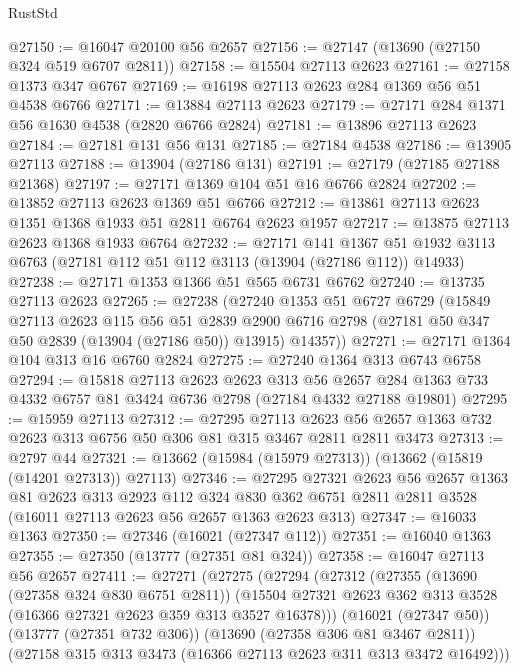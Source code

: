 \begin{lexlean}{RustStd}
\begin{coremodule}
@27150 := @16047 @20100 @56 @2657
@27156 := @27147 (@13690 (@27150 @324 @519 @6707 @2811))
@27158 := @15504 @27113 @2623
@27161 := @27158 @1373 @347 @6767
@27169 := @16198 @27113 @2623 @284 @1369 @56 @51 @4538 @6766
@27171 := @13884 @27113 @2623
@27179 := @27171 @284 @1371 @56 @1630 @4538 (@2820 @6766 @2824)
@27181 := @13896 @27113 @2623
@27184 := @27181 @131 @56 @131
@27185 := @27184 @4538
@27186 := @13905 @27113
@27188 := @13904 (@27186 @131)
@27191 := @27179 (@27185 @27188 @21368)
@27197 := @27171 @1369 @104 @51 @16 @6766 @2824
@27202 := @13852 @27113 @2623 @1369 @51 @6766
@27212 := @13861 @27113 @2623 @1351 @1368 @1933 @51 @2811 @6764 @2623 @1957
@27217 := @13875 @27113 @2623 @1368 @1933 @6764
@27232 := @27171
    @141
    @1367
    @51
    @1932
    @3113
    @6763
    (@27181 @112 @51 @112 @3113 (@13904 (@27186 @112)) @14933)
@27238 := @27171 @1353 @1366 @51 @565 @6731 @6762
@27240 := @13735 @27113 @2623
@27265 := @27238
    (@27240
      @1353
      @51
      @6727
      @6729
      (@15849
        @27113
        @2623
        @115
        @56
        @51
        @2839
        @2900
        @6716
        @2798
        (@27181 @50 @347 @50 @2839 (@13904 (@27186 @50)) @13915)
        @14357))
@27271 := @27171 @1364 @104 @313 @16 @6760 @2824
@27275 := @27240 @1364 @313 @6743 @6758
@27294 := @15818
    @27113
    @2623
    @2623
    @313
    @56
    @2657
    @284
    @1363
    @733
    @4332
    @6757
    @81
    @3424
    @6736
    @2798
    (@27184 @4332 @27188 @19801)
@27295 := @15959 @27113
@27312 := @27295
    @27113
    @2623
    @56
    @2657
    @1363
    @732
    @2623
    @313
    @6756
    @50
    @306
    @81
    @315
    @3467
    @2811
    @2811
    @3473
@27313 := @2797 @44
@27321 := @13662 (@15984 (@15979 @27313)) (@13662 (@15819 (@14201 @27313)) @27113)
@27346 := @27295
    @27321
    @2623
    @56
    @2657
    @1363
    @81
    @2623
    @313
    @2923
    @112
    @324
    @830
    @362
    @6751
    @2811
    @2811
    @3528
    (@16011 @27113 @2623 @56 @2657 @1363 @2623 @313)
@27347 := @16033 @1363
@27350 := @27346 (@16021 (@27347 @112))
@27351 := @16040 @1363
@27355 := @27350 (@13777 (@27351 @81 @324))
@27358 := @16047 @27113 @56 @2657
@27411 := @27271
    (@27275
      (@27294
        (@27312
          (@27355
            (@13690 (@27358 @324 @830 @6751 @2811))
            (@15504 @27321 @2623 @362 @313 @3528 (@16366 @27321 @2623 @359 @313 @3527 @16378)))
          (@16021 (@27347 @50))
          (@13777 (@27351 @732 @306))
          (@13690 (@27358 @306 @81 @3467 @2811))
          (@27158 @315 @313 @3473 (@16366 @27113 @2623 @311 @313 @3472 @16492)))

\end{coremodule}
\end{lexlean}
